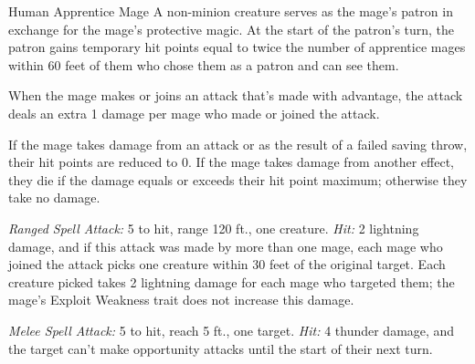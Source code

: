 \documentclass[10pt,a4paper,twoside,bg=print,twocolumn,openany,nodeprecatedcode]{dndbook}
\begin{document}
\begin{DndMonster}[float=t]{Human Apprentice Mage}
\DndMonsterBasics[
armor-class = {14 (studded leather armor)},
hit-points = {\DndDice{13}},
speed = {30 ft.}
]
\DndMonsterAbilityScores[
 str = 8,
 dex = 14,
 con = 10,
 int = 14,
 wis = 11,
 cha = 10
]
\DndMonsterDetails[
skills = {Arcana +5},
languages = {Common plus any two languages},
challenge = 6,
]
A non-minion creature serves as the mage's patron in exchange for the mage's protective magic. At the start of the patron's turn, the patron gains temporary hit points equal to twice the number of apprentice mages within 60 feet of them who chose them as a patron and can see them.

When the mage makes or joins an attack that's made with advantage, the attack deals an extra 1 damage per mage who made or joined the attack.

If the mage takes damage from an attack or as the result of a failed saving throw, their hit points are reduced to 0. If the mage takes damage from another effect, they die if the damage equals or exceeds their hit point maximum; otherwise they take no damage.

\textsl{Ranged Spell Attack:} 5 to hit, range 120 ft., one creature. \textsl{Hit:} 2 lightning damage, and if this attack was made by more than one mage, each mage who joined the attack picks one creature within 30 feet of the original target. Each creature picked takes 2 lightning damage for each mage who targeted them; the mage's Exploit Weakness trait does not increase this damage.

\textsl{Melee Spell Attack:} 5 to hit, reach 5 ft., one target. \textsl{Hit:} 4 thunder damage, and the target can't make opportunity attacks until the start of their next turn.

\end{DndMonster}
\end{document}
